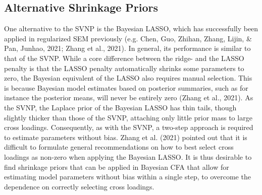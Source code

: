 \documentclass[
  man, donotrepeattitle,floatsintext]{apa6}
\begin{document}
\subsection{Alternative Shrinkage Priors}\label{alternative-shrinkage-priors}

One alternative to the SVNP is the Bayesian LASSO, which has
successfully been applied in regularized SEM previously (e.g. Chen, Guo, Zhihan, Zhang, Lijin, \& Pan, Junhao, 2021; Zhang et al., 2021). In general, its
performance is similar to that of the SVNP. While a core difference
between the ridge- and the LASSO penalty is that the LASSO penalty
automatically shrinks some parameters to zero, the Bayesian equivalent
of the LASSO also requires manual selection. This is because Bayesian
model estimates based on posterior summaries, such as for instance the
posterior means, will never be entirely zero (Zhang et al., 2021). As
the SVNP, the Laplace prior of the Bayesian LASSO has thin tails, though
slightly thicker than those of the SVNP, attaching only little prior
mass to large cross loadings. Consequently, as with the SVNP, a two-step
approach is required to estimate parameters without bias.
Zhang et al. (2021) pointed out that it is difficult to formulate
general recommendations on how to best select cross loadings as non-zero
when applying the Bayesian LASSO. It is thus desirable to find shrinkage
priors that can be applied in Bayesian CFA that allow for estimating
model parameters without bias within a single step, to overcome the
dependence on correctly selecting cross loadings.
\end{document}
